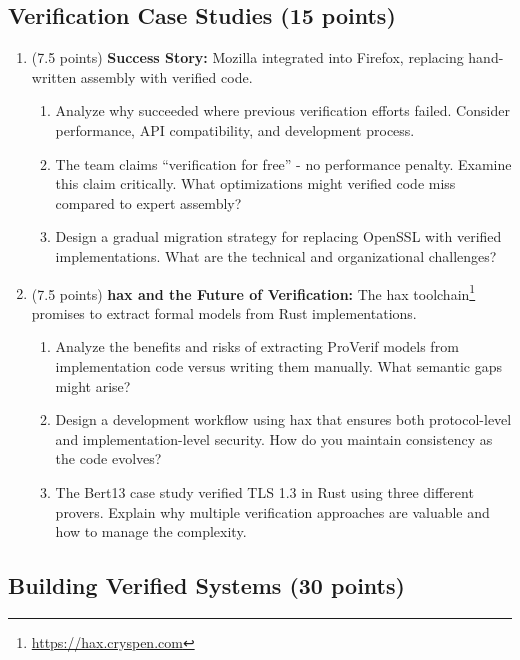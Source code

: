 \documentclass[10pt,a4paper,american]{article}
\begin{document}
\subsection{Verification Case Studies (15 points)}

\begin{enumerate}
	\item (7.5 points) \textbf{\haclstar Success Story:}
	      Mozilla integrated \haclstar into Firefox, replacing hand-written assembly with verified \fstar code.
	      \begin{enumerate}
		      \item Analyze why \haclstar succeeded where previous verification efforts failed. Consider performance, API compatibility, and development process.
		      \item The \haclstar team claims ``verification for free'' - no performance penalty. Examine this claim critically. What optimizations might verified code miss compared to expert assembly?
		      \item Design a gradual migration strategy for replacing OpenSSL with verified implementations. What are the technical and organizational challenges?
	      \end{enumerate}

	\item (7.5 points) \textbf{hax and the Future of Verification:}
	      The hax toolchain\footnote{\url{https://hax.cryspen.com}} promises to extract formal models from Rust implementations.
	      \begin{enumerate}
		      \item Analyze the benefits and risks of extracting ProVerif models from implementation code versus writing them manually. What semantic gaps might arise?
		      \item Design a development workflow using hax that ensures both protocol-level and implementation-level security. How do you maintain consistency as the code evolves?
		      \item The Bert13 case study verified TLS 1.3 in Rust using three different provers. Explain why multiple verification approaches are valuable and how to manage the complexity.
	      \end{enumerate}
\end{enumerate}

\subsection{Building Verified Systems (30 points)}
\end{document}
